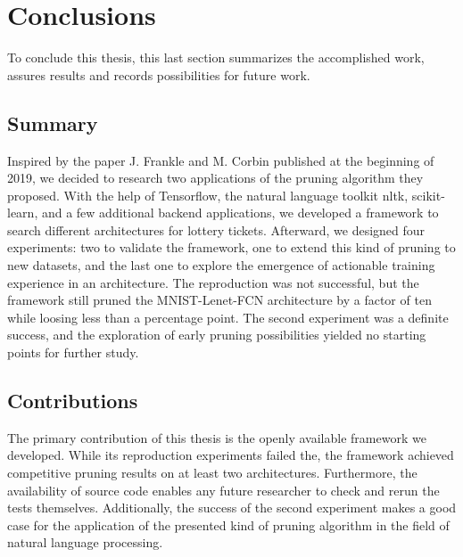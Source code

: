 \chapter{Conclusions}
\label{ch:closure}

To conclude this thesis, this last section summarizes the accomplished work, assures results and records possibilities for future work.

\section{Summary}
Inspired by the paper J. Frankle and M. Corbin published at the beginning of 2019, we decided to research two applications of the pruning algorithm they proposed. With the help of Tensorflow, the natural language toolkit nltk, scikit-learn, and a few additional backend applications, we developed a framework to search different architectures for lottery tickets. Afterward, we designed four experiments: two to validate the framework, one to extend this kind of pruning to new datasets, and the last one to explore the emergence of actionable training experience in an architecture.  The reproduction was not successful, but the framework still pruned the MNIST-Lenet-FCN architecture by a factor of ten while loosing less than a percentage point. The second experiment was a definite success, and the exploration of early pruning possibilities yielded no starting points for further study.

\section{Contributions}
The primary contribution of this thesis is the openly available framework we developed. While its reproduction experiments failed the, the framework achieved competitive pruning results on at least two architectures. Furthermore, the availability of source code enables any future researcher to check and rerun the tests themselves. Additionally, the success of the second experiment makes a good case for the application of the presented kind of pruning algorithm in the field of natural language processing.


